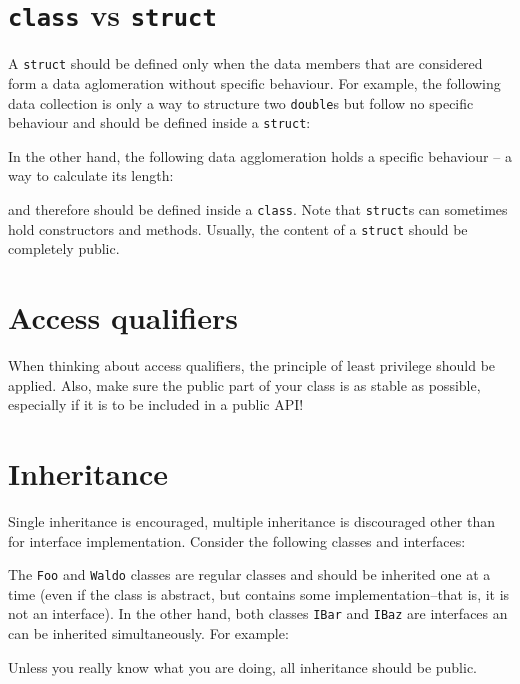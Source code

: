 \section{\texttt{class} vs \texttt{struct}}
A \texttt{struct} should be defined only when the data members that are 
considered form a data aglomeration without specific behaviour. For example, 
the following data collection is only a way to structure two \texttt{double}s 
but follow no specific behaviour and should be defined inside a \texttt{struct}:


In the other hand, the following data agglomeration holds a specific behaviour 
-- a way to calculate its length:


and therefore should be defined inside a \texttt{class}. Note that 
\texttt{struct}s can sometimes hold constructors and methods. Usually, the 
content of a \texttt{struct} should be completely public.

\section{Access qualifiers}
When thinking about access qualifiers, the principle of least privilege should 
be applied. Also, make sure the public part of your class is as stable as 
possible, especially if it is to be included in a public API!


\section{Inheritance}
Single inheritance is encouraged, multiple inheritance is discouraged other 
than for interface implementation. Consider the following classes and 
interfaces:


The \texttt{Foo} and \texttt{Waldo} classes are regular classes and should be 
inherited one at a time (even if the class is abstract, but contains some 
implementation--that is, it is not an interface). In the other hand, both 
classes \texttt{IBar} and \texttt{IBaz} are interfaces an can be inherited 
simultaneously. For example:


Unless you really know what you are doing, all inheritance should be public.
